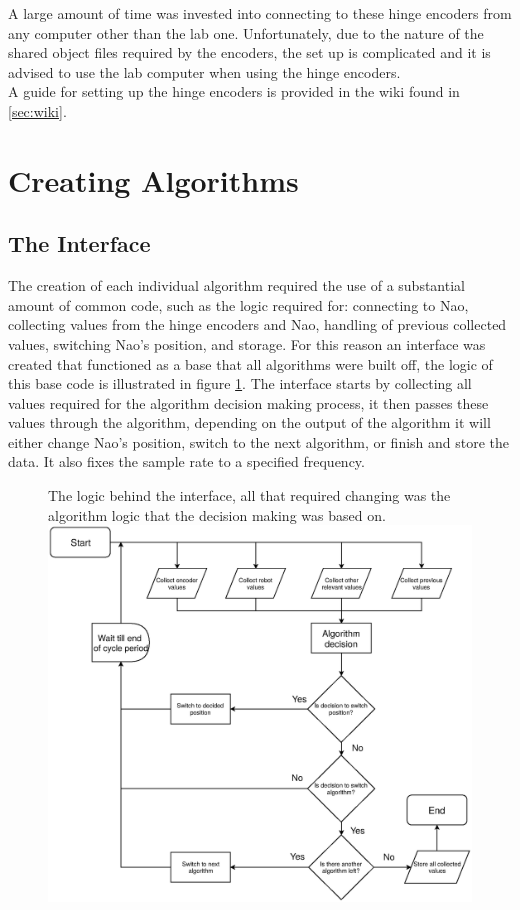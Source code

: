 \documentclass[11pt]{article}
\newcommand*\ruleline[1]{\par\noindent\raisebox{.8ex}{\makebox[\linewidth]{\hrulefill\hspace{1ex}\raisebox{-.8ex}{#1}\hspace{1ex}\hrulefill}}}
\begin{document}
A large amount of time was invested into connecting to these hinge encoders from any computer other than the lab one. Unfortunately, due to the nature of the shared object files required by the encoders, the set up is complicated and it is advised to use the lab computer when using the hinge encoders.\\

A guide for setting up the hinge encoders is provided in the wiki found in \ref{sec:wiki}.


\section{Creating Algorithms}

\ruleline{George Sheppard}
\subsection{The Interface}
The creation of each individual algorithm required the use of a substantial amount of common code, such as the logic required for: connecting to Nao, collecting values from the hinge encoders and Nao, handling of previous collected values, switching Nao's position, and storage. For this reason an interface was created that functioned as a base that all algorithms were built off, the logic of this base code is illustrated in figure \ref{InterfaceLogic}. The interface starts by collecting all values required for the algorithm decision making process, it then passes these values through the algorithm, depending on the output of the algorithm it will either change Nao's position, switch to the next algorithm, or finish and store the data. It also fixes the sample rate to a specified frequency.\\

    \begin{figure}[!htb]
        \centering
        \captionbox
             {The logic behind the interface, all that required changing was the algorithm logic that the decision making was based on.\label{InterfaceLogic}}
             {\includegraphics[width=1.0\textwidth]{InterfaceLogic.eps}}
    \end{figure}
\end{document}
